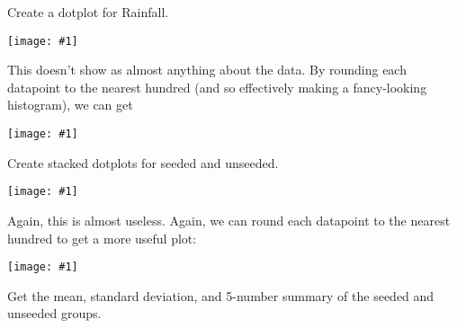 \documentclass[12pt,letterpaper]{hmcpset}
\newcommand{\image}[1]{\begin{center}\texttt{[image: \#1]}\end{center}}
\begin{document}

\begin{problem}[a]

    Create a dotplot for Rainfall.

\end{problem}

\begin{solution}
	\image{{{oct27g1.1}}}
	
	This doesn't show as almost anything about the data.  By rounding each datapoint to the nearest hundred (and so effectively making a fancy-looking histogram), we can get
	
	\image{{{oct27g1.2}}}
\end{solution}
\newpage

\begin{problem}[b]

    Create stacked dotplots for seeded and unseeded.

\end{problem}

\begin{solution}
	\image{{{oct27g2.1}}}
	
	Again, this is almost useless.  Again, we can round each datapoint to the nearest hundred to get a more useful plot:
	
	\image{{{oct27g2.2}}}
\end{solution}
\newpage

\begin{problem}[c]

    Get the mean, standard deviation, and 5-number summary of the seeded and unseeded groups.

\end{problem}
\end{document}
